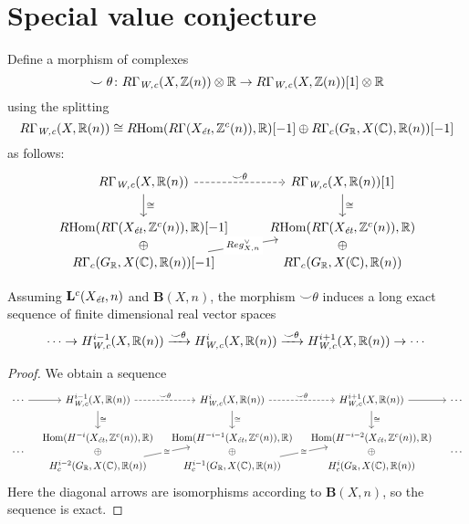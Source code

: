 \documentclass{article}
\numberwithin{equation}{section}
\begin{document}

\section{Special value conjecture}
\label{sec:special-value-conjecture}

\begin{definition}
  Define a morphism of complexes
  \[ \smile\theta\colon R\Gamma_\Wc (X,\ZZ(n)) \otimes \RR \to
    R\Gamma_\Wc (X,\ZZ(n)) [1] \otimes \RR \]
  using the splitting
  \[ R\Gamma_\Wc (X, \RR (n)) \cong
    \RHom (R\Gamma (X_\et, \ZZ^c (n)), \RR) [-1] \oplus
    R\Gamma_c (G_\RR, X (\CC), \RR (n)) [-1] \]
  as follows:
  \[ \begin{tikzcd}
      R\Gamma_\Wc (X, \RR(n)) \ar{d}{\cong}\ar[dashed]{r}{\smile\theta} & R\Gamma_\Wc (X, \RR(n)) [1]\ar{d}{\cong} \\
      \RHom (R\Gamma (X_\et, \ZZ^c (n)), \RR) [-1] & \RHom (R\Gamma (X_\et, \ZZ^c (n)), \RR) \\[-2em]
      \oplus & \oplus \\[-2em]
      R\Gamma_c (G_\RR, X (\CC), \RR (n)) [-1]\ar{uur}[description]{Reg_{X,n}^\vee} & R\Gamma_c (G_\RR, X (\CC), \RR (n))
    \end{tikzcd} \]
\end{definition}

\begin{lemma}
  \label{lemma:smile-theta}
  Assuming $\mathbf{L}^c (X_\et,n)$ and $\mathbf{B} (X,n)$, the morphism
  $\smile\theta$ induces a long exact sequence of finite dimensional real vector
  spaces
  \[ \cdots \to H^{i-1}_\Wc (X, \RR (n))
    \xrightarrow{\smile\theta}
    H^i_\Wc (X, \RR (n))
    \xrightarrow{\smile\theta}
    H^{i+1}_\Wc (X, \RR (n)) \to \cdots \]

  \begin{proof}
    We obtain a sequence
    \[ \begin{tikzcd}[column sep=1em]
        \cdots\ar{r} & H^{i-1}_\Wc (X, \RR(n)) \ar{d}{\cong}\ar[dashed]{r}{\smile\theta} & H^i_\Wc (X, \RR(n))\ar{d}{\cong}\ar[dashed]{r}{\smile\theta} & H^{i+1}_\Wc (X, \RR(n))\ar{d}{\cong} \ar{r} & \cdots \\
        & \Hom (H^{-i} (X_\et, \ZZ^c (n)), \RR) & \Hom (H^{-i-1} (X_\et, \ZZ^c (n)), \RR) & \Hom (H^{-i-2} (X_\et, \ZZ^c (n)), \RR) \\[-2em]
        \cdots & \oplus & \oplus & \oplus & \cdots \\[-2em]
        & H_c^{i-2} (G_\RR, X (\CC), \RR (n))\ar{uur}[description]{\cong} & H_c^{i-1} (G_\RR, X (\CC), \RR (n))\ar{uur}[description]{\cong} & H_c^i (G_\RR, X (\CC), \RR (n))
      \end{tikzcd} \]
    Here the diagonal arrows are isomorphisms according to $\mathbf{B} (X,n)$,
    so the sequence is exact.
  \end{proof}
\end{lemma}
\end{document}
